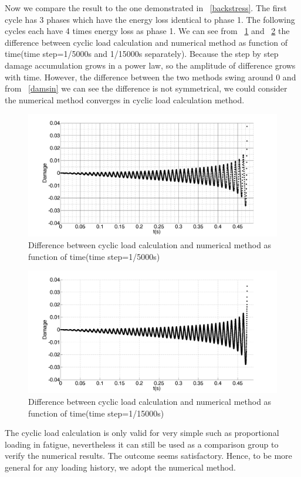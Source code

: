 \documentclass[3p,times,procedia,number]{elsarticle}
\newcommand{\figref}[1]{\figurename~\ref{#1}}
\begin{document}
Now we compare the result to the one demonstrated in \figref{backstress}. The first cycle has 3 phases which have the energy loss identical to phase 1. The following cycles each have 4 times energy loss as phase 1. We can see from \figref{NCdiff100} and \figref{NCdiff300} the difference between cyclic load calculation and numerical method as function of time(time step=1/5000s and 1/15000s separately). Because the step by step damage accumulation grows in a power law, so the amplitude of difference grows with time. However, the difference between the two methods swing around 0 and from \figref{damsin} we can see the difference is not symmetrical, we could consider the numerical method converges in cyclic load calculation method.

\begin{figure}[!h]
	\centering
	\includegraphics[width=\textwidth]{figures//NCdiff100.png} 
	\caption{Difference between cyclic load calculation and numerical method as function of time(time step=1/5000s)}
	\label{NCdiff100}
\end{figure}
\begin{figure}[!h]
	\centering
	\includegraphics[width=\textwidth]{figures//NCdiff300.png} 
	\caption{Difference between cyclic load calculation and numerical method as function of time(time step=1/15000s)}
	\label{NCdiff300}
\end{figure}
The cyclic load calculation is only valid for very simple such as proportional loading in fatigue, nevertheless it can still be used as a comparison group to verify the numerical results. The outcome seems satisfactory. Hence, to be more general for any loading history, we adopt the numerical method.
\end{document}
